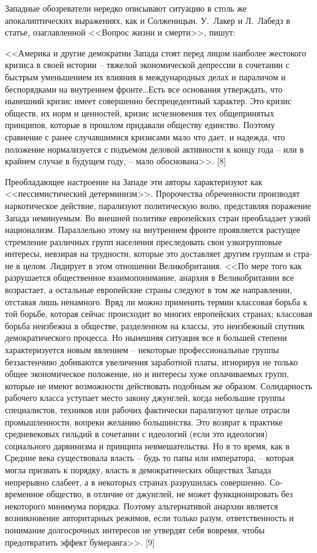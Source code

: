\documentclass{book}
\begin{document}
Западные обозреватели нередко описывают ситуацию в столь же апокалиптических выражениях, как и Солженицын. У.~Лакер и Л.~Лабедз в статье, озаглавленной <<Вопрос жизни и смерти>>, пишут:

<<Америка и другие демократии Запада стоят перед лицом наиболее жестокого кризиса в своей истории -- тяжелой эконо­мической депрессии в сочетании с быстрым уменьшением их влияния в международных делах и параличом и беспорядками на внутреннем фронте\ldots Есть все основания утверждать, что нынешний кризис имеет совершенно беспрецедентный харак­тер. Это кризис обществ, их норм и ценностей, кризис исчез­новения тех общепринятых принципов, которые в прошлом придавали обществу единство. Поэтому сравнение с ранее слу­чавшимися кризисами мало что дает, и надежда, что положе­ние нормализуется с подъемом деловой активности к концу года -- или в крайнем случае в будущем году, -- мало обосно­вана>>. [8]

Преобладающее настроение на Западе эти авторы характе­ризуют как <<пессимистический детерминизм>>. Пророчества обреченности производят наркотическое действие, парализуют политическую волю, представляя поражение Запада немину­емым. Во внешней политике европейских стран преобладает узкий национализм. Параллельно этому на внутреннем фрон­те проявляется растущее стремление различных групп населе­ния преследовать свои узкогрупповые интересы, невзирая на трудности, которые это доставляет другим группам и стра­не в целом. Лидирует в этом отношении Великобритания. <<По мере того как разрушается общественное взаимопонимание, анархия в Великобритании все возрастает, а остальные евро­пейские страны следуют в том же направлении, отставая лишь ненамного. Вряд ли можно применить термин классовая борьба к  той борьбе, которая сейчас происходит во многих евро­пейских странах; классовая борьба неизбежна в обществе, раз­деленном на классы, это неизбежный спутник демократиче­ского процесса. Но нынешняя ситуация все в большей 
степени характеризуется новым явлением -- некоторые професси­ональные группы беззастенчиво добиваются увеличения зара­ботной платы, игнорируя не только общее экономическое положение, но и интересы хуже оплачиваемых групп, которые не имеют возможности действовать подобным же образом. Солидарность рабочего класса уступает место закону джунг­лей, когда небольшие группы специалистов, техников или ра­бочих фактически парализуют целые отрасли промышленно­сти, вопреки желанию большинства. Это возврат к практике средневековых гильдий в сочетании с идеологий (если это идеология) социального дарвинизма и принципа невмешатель­ства. Но в то время, как в Средние века существовала власть -- будь то папы или императора, -- которая могла призвать к поряд­ку, власть в демократических обществах Запада непрерывно слабеет, а в некоторых странах разрушилась совершенно. Со­временное общество, в отличие от джунглей, не может функ­ционировать без некоторого минимума порядка. Поэтому альтернативой анархии является возникновение 
авторитарных режимов, если только разум, ответственность и понимание долгосрочных интересов не утвердят себя вовремя, чтобы предотвратить эффект бумеранга>>. [9]
\end{document}
